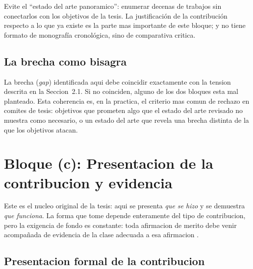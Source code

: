 \documentclass[11pt]{article}
\begin{document}
\begin{cajaAlerta}
Evite el ``estado del arte panoramico'': enumerar decenas de trabajos sin
conectarlos con los objetivos de la tesis. La justificación de la contribución
respecto a lo que ya existe es la parte mas importante de este bloque; y no tiene formato
de monografía cronológica, sino de comparativa critica. 
\end{cajaAlerta}

\subsection{La brecha como bisagra}

La brecha (\emph{gap}) identificada aqui debe coincidir exactamente con la
tension descrita en la Seccion~2.1. Si no coinciden, alguno de los dos
bloques esta mal planteado. Esta coherencia es, en la practica, el criterio
mas comun de rechazo en comites de tesis: objetivos que prometen algo que el
estado del arte revisado no muestra como necesario, o un estado del arte que
revela una brecha distinta de la que los objetivos atacan.

\section{Bloque (c): Presentacion de la contribucion y evidencia}

Este es el nucleo original de la tesis: aqui se presenta \emph{que se hizo} y
se demuestra \emph{que funciona}. La forma que tome depende enteramente del
tipo de contribucion, pero la exigencia de fondo es constante: toda
afirmacion de merito debe venir acompañada de evidencia de la clase adecuada
a esa afirmacion \citep{zobel2014writing}.

\subsection{Presentacion formal de la contribucion}
\end{document}
